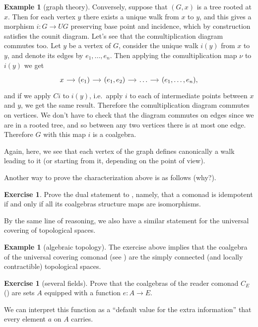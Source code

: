 \documentclass[12pt,oneside,headings=small]{scrbook}
\numberwithin{equation}{section}
\theoremstyle{plain}
\theoremstyle{definition}
\newtheorem{eg}[thm]{Example}
\newtheorem{ex}[thm]{Exercise}
\newcommand{\ar}[2][]{\arrow{#2}{#1}}
\DeclareMathOperator{\1}{\mathbbm{1}}
\DeclareMathOperator{\2}{\mathbbm{2}}
\begin{document}
\begin{eg}[graph theory]
 Conversely, suppose that $(G,x)$ is a tree rooted at $x$. Then for each vertex $y$ there exists a unique walk from $x$ to $y$, and this gives a morphism $i:G\to UG$ preserving base point and incidence, which by construction satisfies the counit diagram. Let's see that the comultiplication diagram commutes too. Let $y$ be a vertex of $G$, consider the unique walk $i(y)$ from $x$ to $y$, and denote its edges by $e_1,\dots,e_n$. Then applying the comultiplication map $\nu$ to $i(y)$ we get 
 $$
 \begin{tikzcd}[sep=small]
  x \ar{r} & (e_1) \ar{r} & (e_1,e_2) \ar{r} &\dots \ar{r} & (e_1,\dots,e_n) ,
 \end{tikzcd}
 $$
 and if we apply $Ci$ to $i(y)$, i.e.~apply $i$ to each of intermediate points between $x$ and $y$, we get the same result. Therefore the comultiplication diagram commutes on vertices.  
 We don't have to check that the diagram commutes on edges since we are in a rooted tree, and so between any two vertices there is at most one edge. Therefore $G$ with this map $i$ is a coalgebra.
\end{eg}

Again, here, we see that each vertex of the graph defines canonically a walk leading to it (or starting from it, depending on the point of view).


Another way to prove the characterization above is as follows (why?).

\begin{ex}
 Prove the dual statement to , namely, that a comonad is idempotent if and only if all its coalgebras structure maps are isomorphisms. 
\end{ex}

By the same line of reasoning, we also have a similar statement for the universal covering of topological spaces.

\begin{eg}[algebraic topology]
 The exercise above implies that the coalgebra of the universal covering comonad (see ) are the simply connected (and locally contractible) topological spaces. 
\end{eg}


\begin{ex}[several fields]
 Prove that the coalgebras of the reader comonad $C_E$ () are sets $A$ equipped with a function $e:A\to E$. 
 
 We can interpret this function as a ``default value for the extra information'' that every element $a$ on $A$ carries.
\end{ex}
\end{document}
